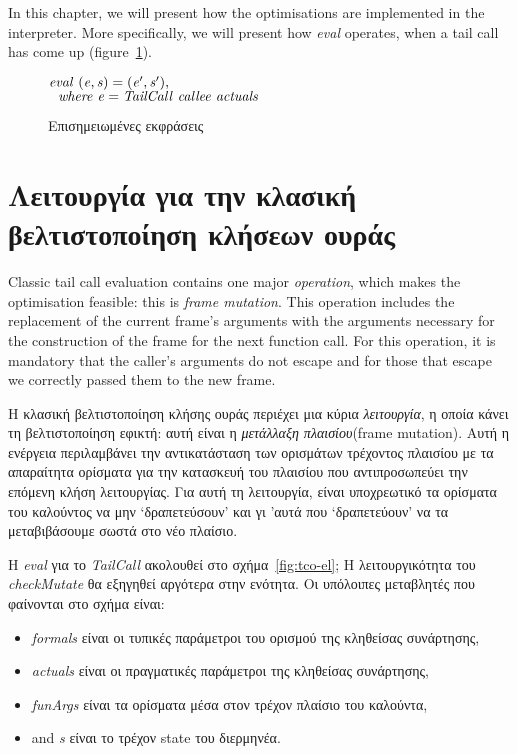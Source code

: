 \documentclass[diploma]{softlab-thesis}
\begin{document}
In this chapter, we will present how the optimisations are implemented in the interpreter.
More specifically, we will present how \textit{eval} operates, when a tail call has come up (figure~\ref{fig:annos-el}).
\begin{figure}[h]
$\mathit{eval \hfill\ (e, s) = (e', s'), }$ \\
$\mathit{\hfill\ \hfill\ where \hfill\ e = TailCall \hfill\ callee \hfill\ actuals}$
\caption{Επισημειωμένες εκφράσεις\label{fig:annos-el}}
\end{figure}


\section {Λειτουργία για την κλασική βελτιστοποίηση κλήσεων ουράς}

Classic tail call evaluation contains one major \textit{operation}, which makes the optimisation 
feasible: this is \textit{frame mutation}. This operation includes the replacement of the current frame's arguments 
with the arguments necessary for the construction of the frame for the next function call. For this operation,
it is mandatory that the caller's arguments do not escape and for those that escape we correctly passed them 
to the new frame. 

Η κλασική βελτιστοποίηση κλήσης ουράς περιέχει μια κύρια \textit{λειτουργία}, η οποία κάνει τη βελτιστοποίηση
εφικτή: αυτή είναι η \textit{μετάλλαξη πλαισίου}(frame mutation). Αυτή η ενέργεια περιλαμβάνει την αντικατάσταση 
των ορισμάτων τρέχοντος πλαισίου με τα απαραίτητα ορίσματα για την κατασκευή του πλαισίου που αντιπροσωπεύει 
την επόμενη κλήση λειτουργίας. Για αυτή τη λειτουργία, είναι υποχρεωτικό τα ορίσματα του καλούντος να μην 
`δραπετεύσουν' και γι 'αυτά που `δραπετεύουν' να τα μεταβιβάσουμε σωστά στο νέο πλαίσιο.

Η \textit{eval} για το \textit{TailCall} ακολουθεί στο σχήμα~\ref{fig:tco-el}; 
Η λειτουργικότητα του \textit{checkMutate} θα εξηγηθεί αργότερα στην ενότητα. Οι υπόλοιπες μεταβλητές 
που φαίνονται στο σχήμα είναι:
\begin{itemize}
  \item \textit{formals} είναι οι τυπικές παράμετροι του ορισμού της κληθείσας συνάρτησης,
  \item \textit{actuals} είναι οι πραγματικές παράμετροι της κληθείσας συνάρτησης,
  \item \textit{funArgs} είναι τα ορίσματα μέσα στον τρέχον πλαίσιο του καλούντα,
  \item and \textit{s} είναι το τρέχον state του διερμηνέα.
\end{itemize}
\end{document}
